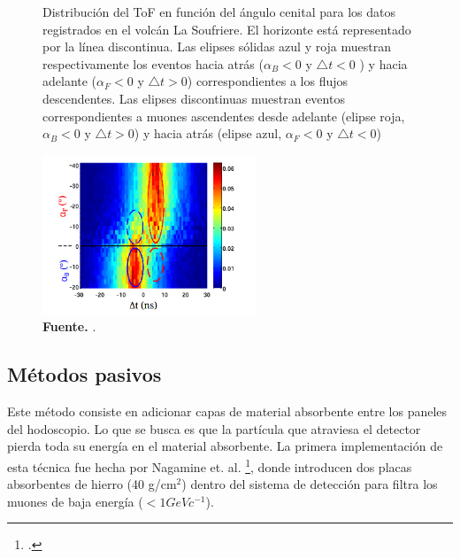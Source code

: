  \begin{figure}[h]
    \begin{center}
        \caption{Distribución del ToF en función del ángulo cenital para los datos registrados en el volcán La Soufriere. El horizonte está representado por la línea discontinua. Las elipses sólidas azul y roja muestran respectivamente los eventos hacia atrás ($\alpha_{B}  < 0 $  y $\bigtriangleup t < 0$ ) y hacia adelante ($\alpha_{F} < 0$ y $\bigtriangleup t > 0$) correspondientes a los flujos descendentes. Las elipses discontinuas muestran eventos correspondientes a muones ascendentes desde adelante (elipse roja, $\alpha_{B} < 0$ y $\bigtriangleup t > 0$) y hacia atrás (elipse azul, $\alpha_{F} < 0$ y $\bigtriangleup t <0$) }
        \includegraphics[width=0.57\textwidth]{Figures/imagenes/ToF.png}
        \caption*{\textbf{Fuente.} \cite{jourde2013effects}. }
        \label{tof}
    \end{center}
\end{figure} 
 
\subsection{Métodos pasivos}
Este método consiste en adicionar capas de material absorbente entre los paneles del hodoscopio. Lo que se busca es que la partícula que atraviesa el detector pierda toda su energía en el material absorbente.
La primera implementación de esta técnica fue hecha por Nagamine et. al. \footcite{Nishiyama2014}, donde introducen dos placas absorbentes de hierro (40 g/cm$^{2}$) dentro del sistema de detección para filtra los muones de baja energía ($< 1 GeVc^{-1}$).

 

